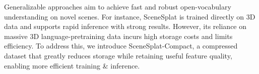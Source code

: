 \documentclass[10pt,twocolumn,letterpaper]{article}
\begin{document}
Generalizable approaches aim to achieve fast and robust open-vocabulary understanding on novel scenes. For instance, SceneSplat \cite{li2025scenesplat} is trained directly on 3D data and supports rapid inference with strong results. However, its reliance on massive 3D language-pretraining data incurs high storage costs and limits efficiency. To address this, we introduce SceneSplat-Compact, a compressed dataset that greatly reduces storage while retaining useful feature quality, enabling more efficient training \& inference.
\end{document}
